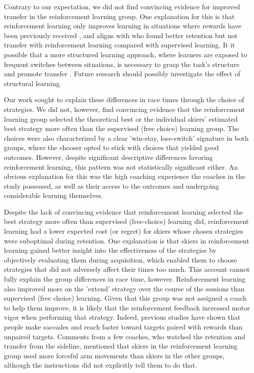 \documentclass[pdflatex,sn-mathphys-num]{sn-jnl}%
\theoremstyle{thmstyleone}%
\theoremstyle{thmstyletwo}%
\theoremstyle{thmstylethree}%
\begin{document}
Contrary to our expectation, we did not find convincing evidence for improved transfer in the reinforcement learning group. One explanation for this is that reinforcement learning only improves learning in situations where rewards have been previously received \cite{robertson_memory_2018}, and aligns with \cite{hasson_reinforcement_2015} who found better retention but not transfer with reinforcement learning compared with supervised learning. It it possible that a more structured learning approach, where learners are exposed to frequent switches between situations, is necessary to grasp the task's structure and promote transfer \cite{braun_structure_2010}. Future research should possibly investigate the effect of structural learning. 

Our work sought to explain these differences in race times through the choice of strategies. We did not, however,  find convincing evidence that the reinforcement learning group selected the theoretical best or the individual skiers' estimated best strategy more often than the supervised (free choice) learning group. The choices were also characterized by a clear 'win-stay, lose-switch' signature in both groups, where the chooser opted to stick with choices that yielded good outcomes. However, despite significant descriptive differences favoring reinforcement learning, this pattern was not statistically significant either. An obvious explanation for this was the high coaching experience the coaches in the study possessed, as well as their access to the outcomes and undergoing considerable learning themselves. 



Despite the lack of convincing evidence that reinforcement learning selected the best strategy more often than supervised (free-choice) learning did, reinforcement learning had a lower expected cost (or regret) for skiers whose chosen strategies were suboptimal during retention. One explanation is that skiers in reinforcement learning gained better insight into the effectiveness of the strategies by objectively evaluating them during acquisition, which enabled them to choose strategies that did not adversely affect their times too much. This account cannot fully explain the group differences in race time, however. Reinforcement learning also improved more on the 'extend' strategy over the course of the sessions than supervised (free choice) learning. Given that this group was not assigned a coach to help them improve, it is likely that the reinforcement feedback increased motor vigor \cite{shadmehr_vigor_2020, pietro_mazzoni_why_2007, niv_normative_2006} when performing that strategy. Indeed, previous studies have shown that people make saccades \cite{takikawa_modulation_2002} and reach faster \cite{summerside_vigor_2018} toward targets paired with rewards than unpaired targets. Comments from a few coaches, who watched the retention and transfer from the sideline, mentioned that skiers in the reinforcement learning group used more forceful arm movements than skiers in the other groups, although the instructions did not explicitly tell them to do that.
\end{document}
